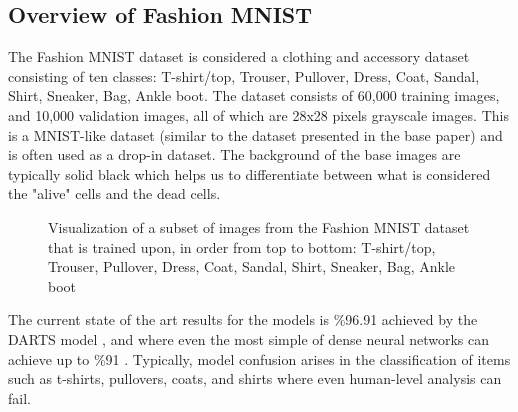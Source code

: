 \documentclass[conference]{IEEEtran}
\begin{document}
\subsection{Overview of Fashion MNIST}

The Fashion MNIST dataset is considered a clothing and accessory dataset consisting of ten classes: T-shirt/top, Trouser, Pullover, Dress, Coat, Sandal, Shirt, Sneaker, Bag, Ankle boot. The dataset consists of 60,000 training images, and 10,000 validation images, all of which are 28x28 pixels grayscale images. This is a MNIST-like dataset (similar to the dataset presented in the base paper) and is often used as a drop-in dataset. The background of the base images are typically solid black which helps us to differentiate between what is considered the "alive" cells and the dead cells. 

\begin{figure}[htbp]
\caption{ Visualization of a subset of images from the Fashion MNIST dataset that is trained upon, in order from top to bottom: T-shirt/top, Trouser, Pullover, Dress, Coat, Sandal, Shirt, Sneaker, Bag, Ankle boot } 
\end{figure}

The current state of the art results for the models is \%96.91 achieved by the DARTS model \cite{Darts}, and where even the most simple of dense neural networks can achieve up to \%91 \cite{tf_fmnist}. Typically, model confusion arises in the classification of items such as t-shirts, pullovers, coats, and shirts where even human-level analysis can fail.
\end{document}
